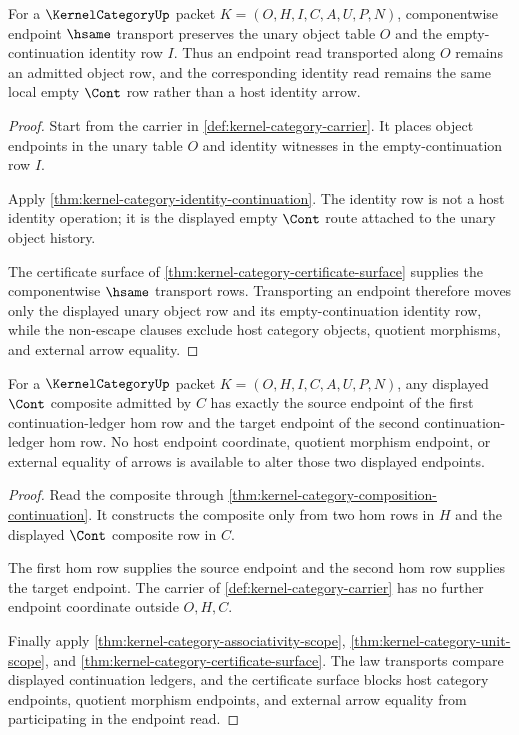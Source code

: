 \begin{theorem}
\label{thm:kernel-category-endpoint-transport-closure}
For a $\KernelCategoryUp$ packet $K=(O,H,I,C,A,U,P,N)$, componentwise endpoint $\hsame$ transport preserves the unary object table $O$ and the empty-continuation identity row $I$. Thus an endpoint read transported along $O$ remains an admitted object row, and the corresponding identity read remains the same local empty $\Cont$ row rather than a host identity arrow.
\end{theorem}
\begin{proof}
Start from the carrier in \autoref{def:kernel-category-carrier}. It places object endpoints in the unary table $O$ and identity witnesses in the empty-continuation row $I$.

Apply \autoref{thm:kernel-category-identity-continuation}. The identity row is not a host identity operation; it is the displayed empty $\Cont$ route attached to the unary object history.

The certificate surface of \autoref{thm:kernel-category-certificate-surface} supplies the componentwise $\hsame$ transport rows. Transporting an endpoint therefore moves only the displayed unary object row and its empty-continuation identity row, while the non-escape clauses exclude host category objects, quotient morphisms, and external arrow equality.
\end{proof}

\begin{theorem}
\label{thm:kernel-category-composite-endpoint-determinacy}
For a $\KernelCategoryUp$ packet $K=(O,H,I,C,A,U,P,N)$, any displayed $\Cont$ composite admitted by $C$ has exactly the source endpoint of the first continuation-ledger hom row and the target endpoint of the second continuation-ledger hom row. No host endpoint coordinate, quotient morphism endpoint, or external equality of arrows is available to alter those two displayed endpoints.
\end{theorem}
\begin{proof}
Read the composite through \autoref{thm:kernel-category-composition-continuation}. It constructs the composite only from two hom rows in $H$ and the displayed $\Cont$ composite row in $C$.

The first hom row supplies the source endpoint and the second hom row supplies the target endpoint. The carrier of \autoref{def:kernel-category-carrier} has no further endpoint coordinate outside $O,H,C$.

Finally apply \autoref{thm:kernel-category-associativity-scope}, \autoref{thm:kernel-category-unit-scope}, and \autoref{thm:kernel-category-certificate-surface}. The law transports compare displayed continuation ledgers, and the certificate surface blocks host category endpoints, quotient morphism endpoints, and external arrow equality from participating in the endpoint read.
\end{proof}

